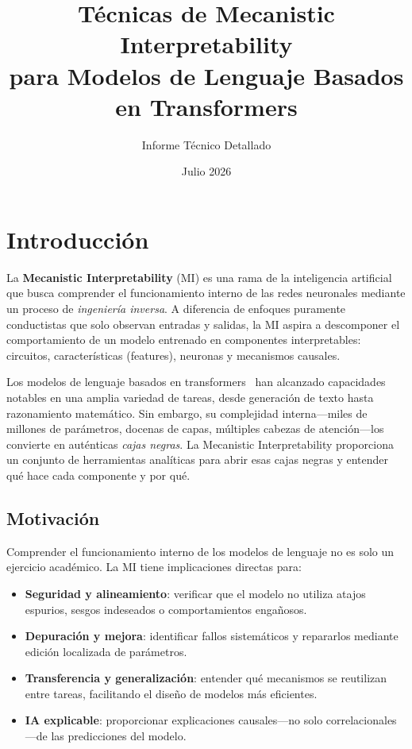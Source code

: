 \documentclass[11pt,a4paper]{report}
\title{\textbf{Técnicas de Mecanistic Interpretability\\para Modelos de Lenguaje Basados en Transformers}}
\author{\large Informe Técnico Detallado}
\date{\large Julio 2026}
\theoremstyle{definition}
\begin{document}
\maketitle
\thispagestyle{empty}
\newpage
\pagestyle{fancy}

\tableofcontents
\newpage

\chapter{Introducción}

La \textbf{Mecanistic Interpretability} (MI) es una rama de la inteligencia artificial que busca comprender el funcionamiento interno de las redes neuronales mediante un proceso de \emph{ingeniería inversa}. A diferencia de enfoques puramente conductistas que solo observan entradas y salidas, la MI aspira a descomponer el comportamiento de un modelo entrenado en componentes interpretables: circuitos, características (features), neuronas y mecanismos causales.

Los modelos de lenguaje basados en transformers~\cite{vaswani2017attention} han alcanzado capacidades notables en una amplia variedad de tareas, desde generación de texto hasta razonamiento matemático. Sin embargo, su complejidad interna---miles de millones de parámetros, docenas de capas, múltiples cabezas de atención---los convierte en auténticas \emph{cajas negras}. La Mecanistic Interpretability proporciona un conjunto de herramientas analíticas para abrir esas cajas negras y entender qué hace cada componente y por qué.

\section{Motivación}

Comprender el funcionamiento interno de los modelos de lenguaje no es solo un ejercicio académico. La MI tiene implicaciones directas para:

\begin{itemize}
    \item \textbf{Seguridad y alineamiento}: verificar que el modelo no utiliza atajos espurios, sesgos indeseados o comportamientos engañosos.
    \item \textbf{Depuración y mejora}: identificar fallos sistemáticos y repararlos mediante edición localizada de parámetros.
    \item \textbf{Transferencia y generalización}: entender qué mecanismos se reutilizan entre tareas, facilitando el diseño de modelos más eficientes.
    \item \textbf{IA explicable}: proporcionar explicaciones causales---no solo correlacionales---de las predicciones del modelo.
\end{itemize}
\end{document}
